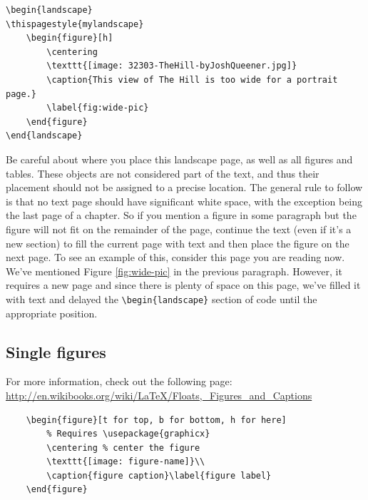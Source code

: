 \begin{verbatim}
\begin{landscape}
\thispagestyle{mylandscape}
	\begin{figure}[h]
		\centering
		\texttt{[image: 32303-TheHill-byJoshQueener.jpg]}
		\caption{This view of The Hill is too wide for a portrait page.}
		\label{fig:wide-pic}
	\end{figure}
\end{landscape}
\end{verbatim}

Be careful about where you place this landscape page, as well as all figures and tables. These objects are not considered part of the text, and thus their placement should not be assigned to a precise location. The general rule to follow is that no text page should have significant white space, with the exception being the last page of a chapter. So if you mention a figure in some paragraph but the figure will not fit on the remainder of the page, continue the text (even if it's a new section) to fill the current page with text and then place the figure on the next page. To see an example of this, consider this page you are reading now. We've mentioned Figure \ref{fig:wide-pic} in the previous paragraph. However, it requires a new page and since there is plenty of space on this page, we've filled it with text and delayed the \verb|\begin{landscape}| section of code until the appropriate position.

\subsection{Single figures}
For more information, check out the following page: \\ \href{http://en.wikibooks.org/wiki/LaTeX/Floats,_Figures_and_Captions}{http://en.wikibooks.org/wiki/LaTeX/Floats,\_Figures\_and\_Captions}
\begin{verbatim}
    \begin{figure}[t for top, b for bottom, h for here]
        % Requires \usepackage{graphicx}
        \centering % center the figure
        \texttt{[image: figure-name]}\\
        \caption{figure caption}\label{figure label}
    \end{figure}
\end{verbatim}

